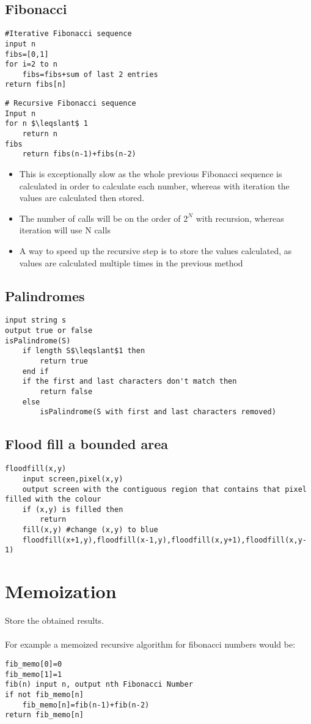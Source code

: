 \documentclass{article}[18pt]
\begin{document}
\subsection{Fibonacci}
\begin{lstlisting}[mathescape=true]
#Iterative Fibonacci sequence
input n
fibs=[0,1]
for i=2 to n
	fibs=fibs+sum of last 2 entries
return fibs[n]
\end{lstlisting}
\begin{lstlisting}[mathescape=true]
# Recursive Fibonacci sequence
Input n
for n $\leqslant$ 1
	return n
fibs
	return fibs(n-1)+fibs(n-2) 
\end{lstlisting}
\begin{itemize}
\item This is exceptionally slow as the whole previous Fibonacci sequence is calculated in order to calculate each number, whereas with iteration the values are calculated then stored.
\item The number of calls will be on the order of $2^{N}$ with recursion, whereas iteration will use N calls
\item A way to speed up the recursive step is to store the values calculated, as values are calculated multiple times in the previous method
\end{itemize}
\subsection{Palindromes}
\begin{lstlisting}[mathescape=true]
input string s
output true or false
isPalindrome(S)
	if length S$\leqslant$1 then
		return true
	end if
	if the first and last characters don't match then
		return false
	else
		isPalindrome(S with first and last characters removed)
\end{lstlisting}
\subsection{Flood fill a bounded area}
\begin{lstlisting}[mathescape=true]
floodfill(x,y)
	input screen,pixel(x,y)
	output screen with the contiguous region that contains that pixel filled with the colour
	if (x,y) is filled then
		return
	fill(x,y) #change (x,y) to blue
	floodfill(x+1,y),floodfill(x-1,y),floodfill(x,y+1),floodfill(x,y-1)
\end{lstlisting}


\section{Memoization}
Store the obtained results.\\
\\
For example a memoized recursive algorithm for fibonacci numbers would be:
\begin{lstlisting}[mathescape=true]
fib_memo[0]=0
fib_memo[1]=1
fib(n) input n, output nth Fibonacci Number
if not fib_memo[n]
	fib_memo[n]=fib(n-1)+fib(n-2)
return fib_memo[n]
\end{lstlisting}
\end{document}
